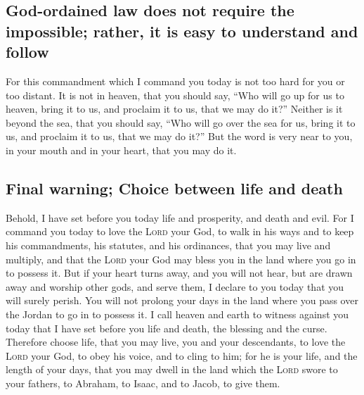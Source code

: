\hypertarget{god-ordained-law-does-not-require-the-impossible-rather-it-is-easy-to-understand-and-follow}{%
\subsection{God-ordained law does not require the impossible; rather, it
is easy to understand and
follow}\label{god-ordained-law-does-not-require-the-impossible-rather-it-is-easy-to-understand-and-follow}}

 For this commandment which I command you today is not
too hard for you or too distant.  It is not in heaven,
that you should say, ``Who will go up for us to heaven, bring it to us,
and proclaim it to us, that we may do it?''  Neither is
it beyond the sea, that you should say, ``Who will go over the sea for
us, bring it to us, and proclaim it to us, that we may do it?''
 But the word is very near to you, in your mouth and in
your heart, that you may do it.

\hypertarget{final-warning-choice-between-life-and-death}{%
\subsection{Final warning; Choice between life and
death}\label{final-warning-choice-between-life-and-death}}

 Behold, I have set before you today life and prosperity,
and death and evil.  For I command you today to love the
\textsc{Lord} your God, to walk in his ways and to keep his
commandments, his statutes, and his ordinances, that you may live and
multiply, and that the \textsc{Lord} your God may bless you in the land
where you go in to possess it.  But if your heart turns
away, and you will not hear, but are drawn away and worship other gods,
and serve them,  I declare to you today that you will
surely perish. You will not prolong your days in the land where you pass
over the Jordan to go in to possess it.  I call heaven
and earth to witness against you today that I have set before you life
and death, the blessing and the curse. Therefore choose life, that you
may live, you and your descendants,  to love the
\textsc{Lord} your God, to obey his voice, and to cling to him; for he
is your life, and the length of your days, that you may dwell in the
land which the \textsc{Lord} swore to your fathers, to Abraham, to
Isaac, and to Jacob, to give them.

